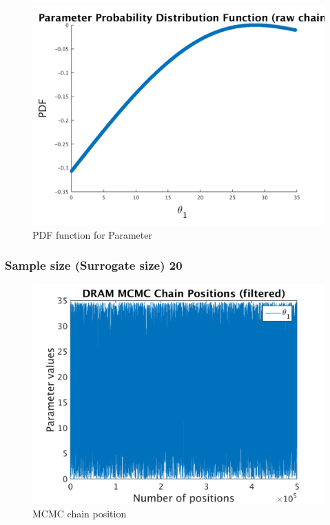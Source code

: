 \begin{figure}[h!]
  
  \centering
   \includegraphics[scale=0.75]{output_10/ip_logLike_unified}
   \caption{PDF function for Parameter }
\end{figure}



\subsubsection{Sample size (Surrogate size) 20 }

\begin{figure}[h!]
  
  \centering
   \includegraphics[scale=0.75]{output_20/simple_ip_chain_pos_filt}
   \caption{MCMC chain position }
\end{figure}


